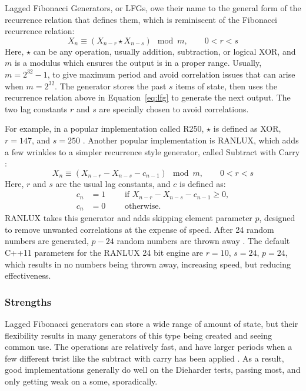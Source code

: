 Lagged Fibonacci Generators, or LFGs, owe their name to the general form of the recurrence relation that defines them, which is reminiscent of the Fibonacci recurrence relation:
\begin{equation} \label{eq:lfg}
    X_{n} \equiv \left(X_{n-r} \star X_{n-s}\right) \mod m, \qquad 0 < r < s
\end{equation}
Here, $\star$ can be any operation, usually addition, subtraction, or logical XOR, and $m$ is a modulus which ensures the output is in a proper range. Usually, $m=2^{32} - 1$, to give maximum period and avoid correlation issues that can arise when $m=2^32$. The generator stores the past $s$ items of state, then uses the recurrence relation above in Equation~\ref{eq:lfg} to generate the next output. The two lag constants $r$ and $s$ are specially chosen to avoid correlations.

For example, in a popular implementation called R250, $\star$ is defined as XOR, $r=147$, and $s=250$ \cite{kirkpatrick1981very}. Another popular implementation is RANLUX, which adds a few wrinkles to a simpler recurrence style generator, called Subtract with Carry \cite{marsaglia1991new,marsaglia2003random}:
\begin{equation} \label{eqn:swc}
    X_{n} \equiv \left(X_{n-r} - X_{n-s} - c_{n-1}\right) \mod m, \qquad 0 < r < s
\end{equation}
Here, $r$ and $s$ are the usual lag constants, and $c$ is defined as:
\begin{align*}
    c_n &= 1 \qquad \text{ if } X_{n-r} - X_{n-s} - c_{n-1} \geq 0, \\
    c_n &= 0 \qquad \text{ otherwise.}
\end{align*}
RANLUX takes this generator and adds skipping element parameter $p$, designed to remove unwanted correlations at the expense of speed. After 24 random numbers are generated, $p-24$ random numbers are thrown away \cite{luscher1994portable,james1994ranlux}. The default C++11 parameters for the RANLUX 24 bit engine are $r = 10$, $s = 24$, $p=24$, which results in no numbers being thrown away, increasing speed, but reducing effectiveness.

\subsubsection{Strengths}
Lagged Fibonacci generators can store a wide range of amount of state, but their flexibility results in many generators of this type being created and seeing common use. The operations are relatively fast, and have larger periods when a few different twist like the subtract with carry has been applied \cite{marsaglia2003random}. As a result, good implementations generally do well on the Dieharder tests, passing most, and only getting weak on a some, sporadically.

